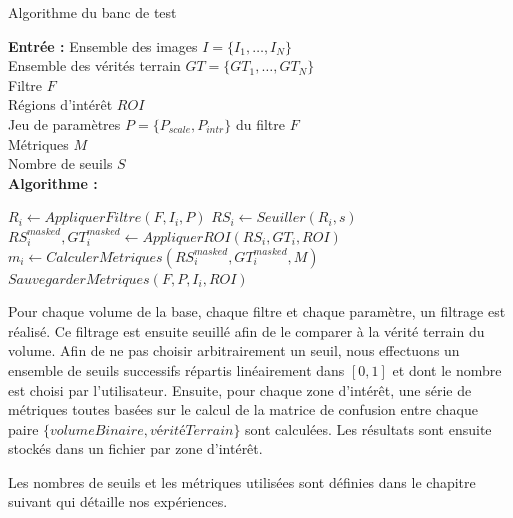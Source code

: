 \begin{algorithm}[!ht]
  \caption{Algorithme du banc de test}\label{alg:BenchmarkStep}
      \textbf{Entrée :}
      Ensemble des images $I=\{I_1,\ldots,I_N\}$ \\
      Ensemble des vérités terrain $GT=\{GT_1,\ldots,GT_N\}$\\
      Filtre $F$\\
      Régions d'intérêt $ROI$\\
      Jeu de paramètres  $P=\{ P_{scale},P_{intr} \} $ du filtre $F$\\ 
      Métriques $M$\\
      Nombre de seuils $S$ \\
      \textbf{Algorithme :}
      \begin{algorithmic}
              \State $R_{i} \gets AppliquerFiltre(F,I_i,P)$
                \State $RS_{i} \gets Seuiller(R_{i},s)$
                \State $RS_{i}^{masked},GT_{i}^{masked} \gets AppliquerROI( RS_{i},GT_{i}, ROI ) $
                \State $m_{i} \gets CalculerM\acute{e}triques(RS_{i}^{masked}, GT_{i}^{masked}, M)$
                \State $SauvegarderM\acute{e}triques(F,P,I_i,ROI)$
              \EndFor
          \EndFor
      \end{algorithmic}
  \end{algorithm}

Pour chaque volume de la base, chaque filtre et chaque paramètre, un filtrage est réalisé. Ce filtrage est ensuite seuillé afin de le comparer à la vérité terrain du volume. Afin de ne pas choisir arbitrairement un seuil, nous effectuons un ensemble de seuils successifs répartis linéairement dans $[0,1]$ et dont le nombre est choisi par l'utilisateur. Ensuite, pour chaque zone d'intérêt, une série de métriques toutes basées sur le calcul de la matrice de confusion entre chaque paire $\{volume Binaire, vérité Terrain\}$ sont calculées. Les résultats sont ensuite stockés dans un fichier par zone d'intérêt.

Les nombres de seuils et les métriques utilisées sont définies dans le chapitre suivant qui détaille nos expériences. 

